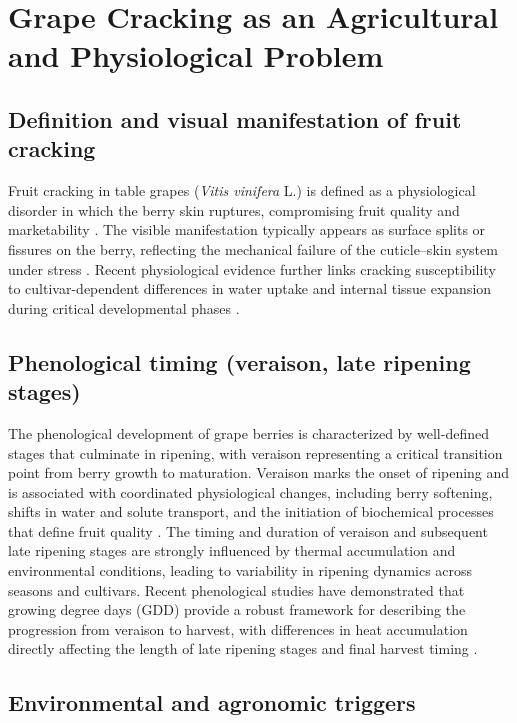 \section{Grape Cracking as an Agricultural and Physiological Problem}
\label{sec:grape_cracking}

\subsection{Definition and visual manifestation of fruit cracking}


Fruit cracking in table grapes (\textit{Vitis vinifera} L.) is defined as a physiological disorder in which the berry skin ruptures, compromising fruit quality and marketability \parencite{horticulturae11111320}.
The visible manifestation typically appears as surface splits or fissures on the berry, reflecting the mechanical failure of the cuticle--skin system under stress \parencite{plants13172400}. 
Recent physiological evidence further links cracking susceptibility to cultivar-dependent differences in water uptake and internal tissue expansion during critical developmental phases \parencite{YU20251506}.


\subsection{Phenological timing (veraison, late ripening stages)}

\noindent
The phenological development of grape berries is characterized by well-defined stages that culminate in ripening, with veraison representing a critical transition point from berry growth to maturation. Veraison marks the onset of ripening and is associated with coordinated physiological changes, including berry softening, shifts in water and solute transport, and the initiation of biochemical processes that define fruit quality \parencite{horticulturae11111320}. The timing and duration of veraison and subsequent late ripening stages are strongly influenced by thermal accumulation and environmental conditions, leading to variability in ripening dynamics across seasons and cultivars. Recent phenological studies have demonstrated that growing degree days (GDD) provide a robust framework for describing the progression from veraison to harvest, with differences in heat accumulation directly affecting the length of late ripening stages and final harvest timing \parencite{horticulturae11050466}.


\subsection{Environmental and agronomic triggers}

